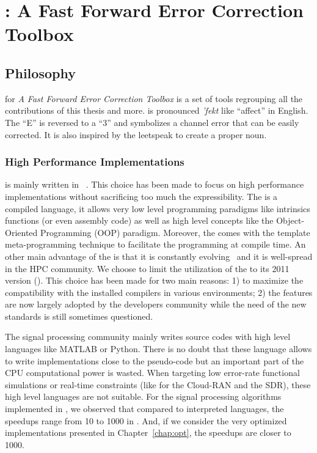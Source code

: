 
\renewcommand{\curChapter}{main/chapter3}

\chapter{\AFFECT: A Fast Forward Error Correction Toolbox}
\label{chap:aff3ct}

\vspace*{\fill}
\minitoccustom
\vspace*{\fill}

\newpage
\section{Philosophy}

\AFFECT for \emph{A Fast Forward Error Correction Toolbox} is a set of tools
regrouping all the contributions of this thesis and more. \AFFECT is pronounced
\emph{\textschwa'fekt} like ``affect'' in English. The ``E'' is reversed to a
``3'' and symbolizes a channel error that can be easily corrected. It is also
inspired by the leetspeak to create a proper noun.

\subsection{High Performance Implementations}

\AFFECT is mainly written in \Cxx~\cite{Stroustrup2013}. This choice has been
made to focus on high performance implementations without sacrificing too much
the expressibility. The \Cxx is a compiled language, it allows very low level
programming paradigms like intrinsics functions (or even assembly code) as well
as high level concepts like the Object-Oriented Programming (OOP) paradigm.
Moreover, the \Cxx comes with the template meta-programming technique to
facilitate the programming at compile time. An other main advantage of the \Cxx
is that it is constantly evolving~\cite{Stroustrup2020} and it is well-spread in
the HPC community. We choose to limit the utilization of the \Cxx to its 2011
version (). This choice has been made for two main reasons: 1) to
maximize the compatibility with the installed compilers in various environments;
2) the  features are now largely adopted by the developers community
while the need of the new \Cxx standards is still sometimes questioned.

The signal processing community mainly writes source codes with high level
languages like MATLAB or Python. There is no doubt that these language allows
to write implementations close to the pseudo-code but an important part of the
CPU computational power is wasted. When targeting low error-rate functional
simulations or real-time constraints (like for the Cloud-RAN and the SDR), these
high level languages are not suitable. For the signal processing algorithms
implemented in \AFFECT, we observed that compared to interpreted languages, the
speedups range from 10 to 1000 in \Cxx. And, if we consider the very optimized
implementations presented in Chapter~\ref{chap:opt}, the speedups are closer to
1000.

